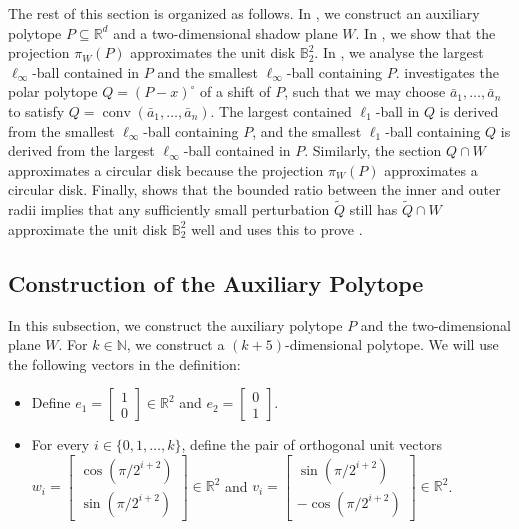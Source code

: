 \documentclass{article}\usepackage[a4paper,margin=20mm]{geometry}
\newcommand{\R}{\mathbb R}
\newcommand{\N}{\mathbb N}
\newcommand{\conv}{\operatorname{conv}}
\newcommand{\ball}{\mathbb{B}_2}
\renewcommand{\subset}{\subseteq}
\begin{document}
The rest of this section is organized as follows.
In , we construct an auxiliary polytope $P \subset \R^d$ and a two-dimensional shadow plane $W$.
In , we show that the projection $\pi_W(P)$ approximates the unit disk $\ball^2$. 
In , we analyse the largest $\ell_\infty$-ball contained in $P$ and the smallest $\ell_\infty$-ball containing $P$.
 investigates the polar polytope $Q = (P-x)^\circ$ of a shift of $P$, such that we may choose $\bar{a}_1,\dots,\bar{a}_n$
to satisfy $Q = \conv(\bar a_1,\dots,\bar a_n)$.
The largest contained $\ell_1$-ball in $Q$ is derived from the smallest $\ell_\infty$-ball containing $P$,
and the smallest $\ell_1$-ball containing $Q$ is derived from the largest $\ell_\infty$-ball contained in $P$.
Similarly, the section $Q \cap W$ approximates a circular disk because the projection $\pi_W(P)$ approximates a circular disk.
Finally,  shows that the bounded ratio between the inner and outer radii implies that any
sufficiently small perturbation $\tilde Q$ still has $\tilde Q \cap W$ approximate the unit disk $\ball^2$ well
and uses this to prove .


\subsection{Construction of the Auxiliary Polytope}\label{sec:lb-construction}

In this subsection, we construct the auxiliary polytope $P$ and the two-dimensional plane $W$.
For $k \in \N$, we construct a $(k + 5)$-dimensional polytope.
We will use the following vectors in the definition:
\begin{itemize}
    \item Define $e_1 = \begin{bmatrix}1\\ 0 \end{bmatrix} \in \R^2$ and $e_2 = \begin{bmatrix} 0\\ 1 \end{bmatrix}$.
    \item For every $i \in \{0, 1, \ldots, k\}$, define the pair of orthogonal unit vectors $w_i  = \begin{bmatrix}\cos(\pi/2^{i+2}) \\ \sin(\pi/2^{i+2}) \end{bmatrix} \in \R^2$ and $v_i =  \begin{bmatrix}\sin(\pi/2^{i+2}) \\ -\cos(\pi/2^{i+2})\end{bmatrix} \in \R^2$.
\end{itemize}
\end{document}
